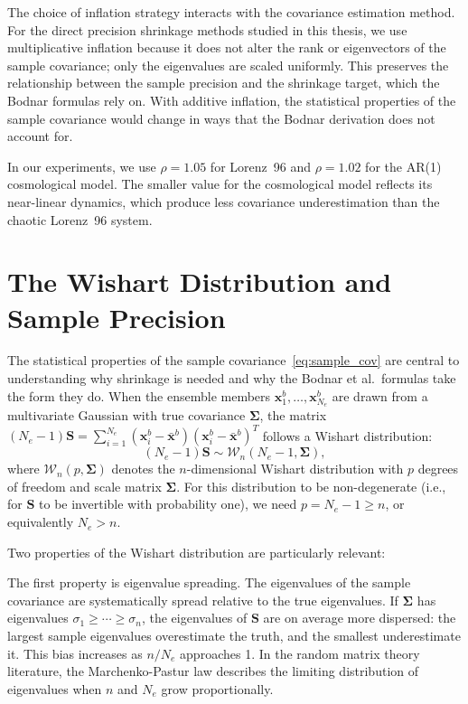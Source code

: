 The choice of inflation strategy interacts with the covariance estimation method. For the direct precision shrinkage methods studied in this thesis, we use multiplicative inflation because it does not alter the rank or eigenvectors of the sample covariance; only the eigenvalues are scaled uniformly. This preserves the relationship between the sample precision and the shrinkage target, which the Bodnar formulas rely on. With additive inflation, the statistical properties of the sample covariance would change in ways that the Bodnar derivation does not account for.

In our experiments, we use $\rho = 1.05$ for Lorenz~96 and $\rho = 1.02$ for the AR(1) cosmological model. The smaller value for the cosmological model reflects its near-linear dynamics, which produce less covariance underestimation than the chaotic Lorenz~96 system.

\section{The Wishart Distribution and Sample Precision}
\label{sec:wishart}

The statistical properties of the sample covariance~\eqref{eq:sample_cov} are central to understanding why shrinkage is needed and why the Bodnar et al.\ formulas take the form they do. When the ensemble members $\mathbf{x}_1^b, \ldots, \mathbf{x}_{N_e}^b$ are drawn from a multivariate Gaussian with true covariance $\boldsymbol{\Sigma}$, the matrix $(N_e - 1)\mathbf{S} = \sum_{i=1}^{N_e}(\mathbf{x}_i^b - \bar{\mathbf{x}}^b)(\mathbf{x}_i^b - \bar{\mathbf{x}}^b)^T$ follows a Wishart distribution:
\begin{equation}
\label{eq:wishart}
(N_e - 1)\mathbf{S} \sim \mathcal{W}_n(N_e - 1, \boldsymbol{\Sigma}),
\end{equation}
where $\mathcal{W}_n(p, \boldsymbol{\Sigma})$ denotes the $n$-dimensional Wishart distribution with $p$ degrees of freedom and scale matrix $\boldsymbol{\Sigma}$. For this distribution to be non-degenerate (i.e., for $\mathbf{S}$ to be invertible with probability one), we need $p = N_e - 1 \geq n$, or equivalently $N_e > n$.

Two properties of the Wishart distribution are particularly relevant:

The first property is eigenvalue spreading. The eigenvalues of the sample covariance are systematically spread relative to the true eigenvalues. If $\boldsymbol{\Sigma}$ has eigenvalues $\sigma_1 \geq \cdots \geq \sigma_n$, the eigenvalues of $\mathbf{S}$ are on average more dispersed: the largest sample eigenvalues overestimate the truth, and the smallest underestimate it. This bias increases as $n/N_e$ approaches 1. In the random matrix theory literature, the Marchenko-Pastur law describes the limiting distribution of eigenvalues when $n$ and $N_e$ grow proportionally.

